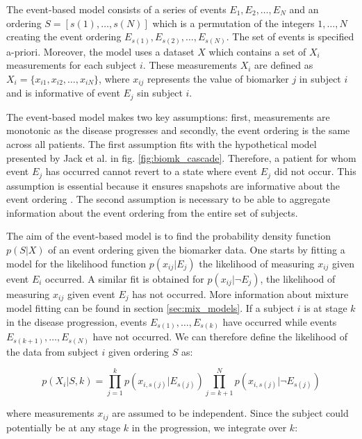 The event-based model consists of a series of events $E_1, E_2, \dots , E_N$ and an ordering $S = [s(1), \dots, s(N)]$ which is a permutation of the integers $1,\dots, N$ creating the event ordering $E_{s(1)}, E_{s(2)},\dots, E_{s(N)}$. The set of events is specified a-priori.  Moreover, the model uses a dataset $X$ which contains a set of $X_i$ measurements for each subject $i$. These measurements $X_i$ are defined as $X_i = \{x_{i1}, x_{i2}, \dots, x_{iN}\}$, where $x_{ij}$ represents the value of biomarker $j$ in subject $i$ and is informative of event $E_j$ sin subject $i$. 

The event-based model makes two key assumptions: first, measurements are monotonic as the disease progresses and secondly, the event ordering is the same across all patients. The first assumption fits with the hypothetical model presented by Jack et al. \cite{jack2010hypothetical} in fig. \ref{fig:biomk_cascade}. Therefore, a patient for whom event $E_j$ has occurred cannot revert to a state where event $E_j$ did not occur. This assumption is essential because it ensures snapshots are informative about the event ordering \cite{fonteijn2012event}. The second assumption is necessary to be able to aggregate information about the event ordering from the entire set of subjects. 

The aim of the event-based model is to find the probability density function $p(S|X)$ of an event ordering given the biomarker data. One starts by fitting a model for the likelihood function $p(x_{ij}|E_j)$ the likelihood of measuring $x_{ij}$ given event $E_i$ occurred. A similar fit is obtained for $p(x_{ij}|\neg E_j)$, the likelihood of measuring $x_{ij}$ given event $E_j$ has not occurred. More information about mixture model fitting can be found in section \ref{sec:mix_models}. If a subject $i$ is at stage $k$ in the disease progression, events $E_{s(1)},\dots, E_{s(k)}$ have occurred while events $E_{s(k+1)},\dots, E_{s(N)}$ have not occurred. We can therefore define the likelihood of the data from subject $i$ given ordering $S$ as:

\begin{equation}
\label{eq:ebm1}
 p(X_i | S, k) = \prod_{j=1}^k p\left(x_{i,s(j)} | E_{s(j)} \right) \prod_{j=k+1}^N p\left(x_{i,s(j)} | \neg E_{s(j)}\right)
\end{equation}
 
where measurements $x_{ij}$ are assumed to be independent. Since the subject could potentially be at any stage $k$ in the progression, we integrate over $k$:

